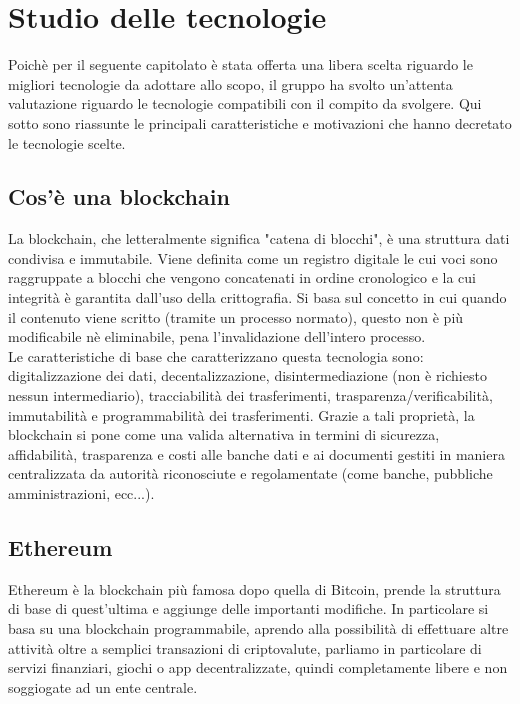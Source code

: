 \appendix
\section{Studio delle tecnologie} \label{appendix:studio}

Poichè per il seguente capitolato è stata offerta una libera scelta riguardo le migliori tecnologie da adottare allo scopo, il gruppo ha svolto un'attenta valutazione
riguardo le tecnologie compatibili con il compito da svolgere.
Qui sotto sono riassunte le principali caratteristiche e motivazioni che hanno decretato le tecnologie scelte.

\subsection{Cos'è una blockchain}
La blockchain, che letteralmente significa "catena di blocchi", è una struttura dati condivisa e
immutabile. Viene definita come un registro digitale le cui voci sono raggruppate a blocchi che
vengono concatenati in ordine cronologico e la cui integrità è garantita dall'uso della crittografia.
Si basa sul concetto in cui quando il contenuto viene scritto (tramite un processo normato), questo non
è più modificabile nè eliminabile, pena l'invalidazione dell'intero processo.\\
Le caratteristiche di base che caratterizzano questa tecnologia sono: digitalizzazione dei dati, decentalizzazione,
disintermediazione (non è richiesto nessun intermediario), tracciabilità dei trasferimenti, trasparenza/verificabilità,
immutabilità e programmabilità dei trasferimenti. Grazie a tali proprietà, la blockchain si pone come una valida
alternativa in termini di sicurezza, affidabilità, trasparenza e costi alle banche dati e ai documenti gestiti in maniera
centralizzata da autorità riconosciute e regolamentate (come banche, pubbliche amministrazioni, ecc...).

\subsection{Ethereum}
Ethereum è la blockchain più famosa dopo quella di Bitcoin, prende la struttura di base di quest'ultima e aggiunge delle
importanti modifiche. In particolare si basa su una blockchain programmabile, aprendo alla possibilità di effettuare altre attività
oltre a semplici transazioni di criptovalute, parliamo in particolare di servizi finanziari, giochi o app decentralizzate, quindi
completamente libere e non soggiogate ad un ente centrale.

